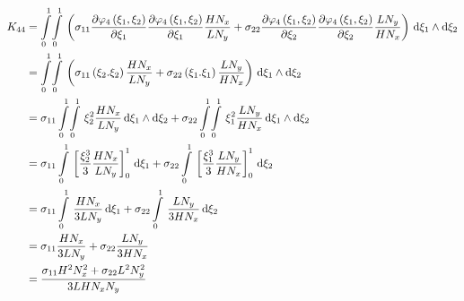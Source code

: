 \begin{equation}
  \begin{aligned}
    K_{44}&=\giint{0}{1}{0}{1}{\pbrac{\sigma_{11}\delby{\lbfn{4}{\xi_{1},\xi_{2}}}{\xi_{1}}\delby{\lbfn{4}{\xi_{1},\xi_{2}}}{\xi_{1}}
        \dfrac{H N_{x}}{L N_{y}}+\sigma_{22}\delby{\lbfn{4}{\xi_{1},\xi_{2}}}{\xi_{2}}\delby{\lbfn{4}{\xi_{1},\xi_{2}}}{\xi_{2}}
        \dfrac{L N_{y}}{H N_{x}}}}{\xi_{1}}{\xi_{2}}\\
    &=\giint{0}{1}{0}{1}{\pbrac{\sigma_{11}\pbrac{\xi_{2}.\xi_{2}}\dfrac{H N_{x}}{L N_{y}}+
    \sigma_{22}\pbrac{\xi_{1}.\xi_{1}}\dfrac{L N_{y}}{H N_{x}}}}{\xi_{1}}{\xi_{2}} \\
    &=\sigma_{11}\giint{0}{1}{0}{1}{\xi_{2}^{2}\dfrac{H N_{x}}{L N_{y}}}{\xi_{1}}{\xi_{2}}+
    \sigma_{22}\giint{0}{1}{0}{1}{\xi_{1}^{2}\dfrac{L N_{y}}{H N_{x}}}{\xi_{1}}{\xi_{2}} \\
    &=\sigma_{11}\gint{0}{1}{\sqbrac{\dfrac{\xi_{2}^{3}}{3}\dfrac{H N_{x}}{L N_{y}}}_{0}^{1}}{\xi_{1}}+
    \sigma_{22}\gint{0}{1}{\sqbrac{\dfrac{\xi_{1}^{3}}{3}\dfrac{L N_{y}}{H N_{x}}}_{0}^{1}}{\xi_{2}} \\
    &=\sigma_{11}\gint{0}{1}{\dfrac{H N_{x}}{3 L N_{y}}}{\xi_{1}}+\sigma_{22}\gint{0}{1}{\dfrac{L N_{y}}{3 H N_{x}}}{\xi_{2}} \\
    &=\sigma_{11}\dfrac{H N_{x}}{3 L N_{y}}+\sigma_{22}\dfrac{L N_{y}}{3 H N_{x}} \\
    &=\dfrac{\sigma_{11}H^{2}N_{x}^{2}+\sigma_{22}L^{2}N_{y}^{2}}{3 L H N_{x} N_{y}}
  \end{aligned}
\end{equation}

